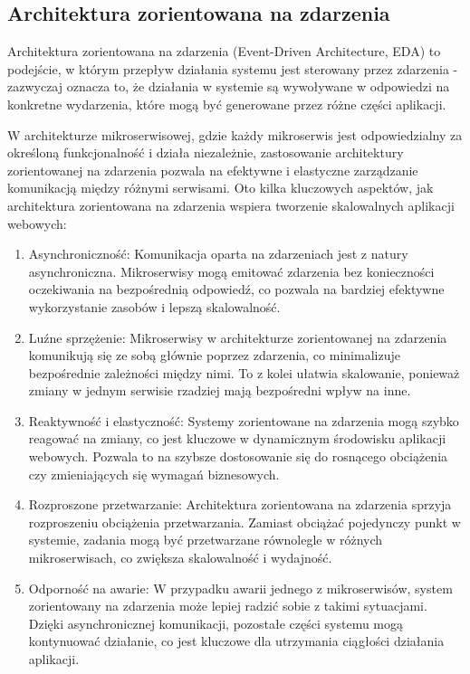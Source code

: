 \subsection{Architektura zorientowana na zdarzenia}

Architektura zorientowana na zdarzenia (Event-Driven Architecture, EDA) to podejście, w którym przepływ działania systemu jest sterowany przez zdarzenia - zazwyczaj oznacza to, że działania w systemie są wywoływane w odpowiedzi na konkretne wydarzenia, które mogą być generowane przez różne części aplikacji.

W architekturze mikroserwisowej, gdzie każdy mikroserwis jest odpowiedzialny za określoną funkcjonalność i działa niezależnie, zastosowanie architektury zorientowanej na zdarzenia pozwala na efektywne i elastyczne zarządzanie komunikacją między różnymi serwisami. Oto kilka kluczowych aspektów, jak architektura zorientowana na zdarzenia wspiera tworzenie skalowalnych aplikacji webowych:

\begin{enumerate}
    \item Asynchroniczność: Komunikacja oparta na zdarzeniach jest z natury asynchroniczna. Mikroserwisy mogą emitować zdarzenia bez konieczności oczekiwania na bezpośrednią odpowiedź, co pozwala na bardziej efektywne wykorzystanie zasobów i lepszą skalowalność.

    \item Luźne sprzężenie: Mikroserwisy w architekturze zorientowanej na zdarzenia komunikują się ze sobą głównie poprzez zdarzenia, co minimalizuje bezpośrednie zależności między nimi. To z kolei ułatwia skalowanie, ponieważ zmiany w jednym serwisie rzadziej mają bezpośredni wpływ na inne.

    \item Reaktywność i elastyczność: Systemy zorientowane na zdarzenia mogą szybko reagować na zmiany, co jest kluczowe w dynamicznym środowisku aplikacji webowych. Pozwala to na szybsze dostosowanie się do rosnącego obciążenia czy zmieniających się wymagań biznesowych.

    \item Rozproszone przetwarzanie: Architektura zorientowana na zdarzenia sprzyja rozproszeniu obciążenia przetwarzania. Zamiast obciążać pojedynczy punkt w systemie, zadania mogą być przetwarzane równolegle w różnych mikroserwisach, co zwiększa skalowalność i wydajność.

    \item Odporność na awarie: W przypadku awarii jednego z mikroserwisów, system zorientowany na zdarzenia może lepiej radzić sobie z takimi sytuacjami. Dzięki asynchronicznej komunikacji, pozostałe części systemu mogą kontynuować działanie, co jest kluczowe dla utrzymania ciągłości działania aplikacji.
\end{enumerate}

